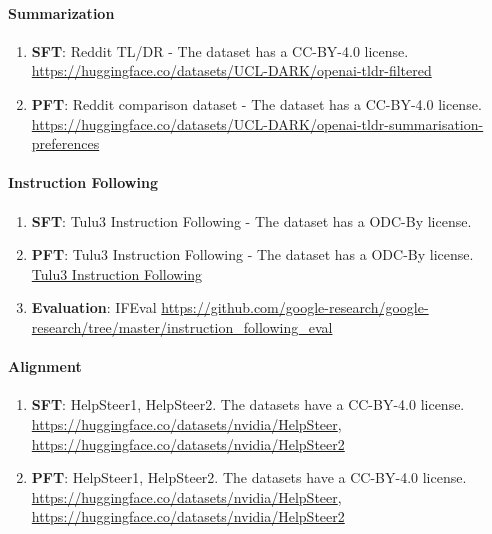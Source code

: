 \paragraph{Summarization}
\begin{enumerate}
    \item \textbf{SFT}: Reddit TL/DR - The dataset has a CC-BY-4.0 license. \href{https://huggingface.co/datasets/UCL-DARK/openai-tldr-filtered}{https://huggingface.co/datasets/UCL-DARK/openai-tldr-filtered}
    \item \textbf{PFT}: Reddit comparison dataset - The dataset has a CC-BY-4.0 license. \href{https://huggingface.co/datasets/UCL-DARK/openai-tldr-summarisation-preferences}{https://huggingface.co/datasets/UCL-DARK/openai-tldr-summarisation-preferences}

\end{enumerate}

\paragraph{Instruction Following}
\begin{enumerate}
    \item \textbf{SFT}: Tulu3 Instruction Following - The dataset has a ODC-By license. \href{https://huggingface.co/datasets/allenai/tulu-3-sft-personas-instruction-following}{}
    \item \textbf{PFT}: Tulu3 Instruction Following - The dataset has a ODC-By license. \href{https://huggingface.co/datasets/allenai/tulu-3-pref-personas-instruction-following}{Tulu3 Instruction Following}
    \item \textbf{Evaluation}: IFEval \href{https://github.com/google-research/google-research/tree/master/instruction_following_eval}{https://github.com/google-research/google-research/tree/master/instruction\_following\_eval}
\end{enumerate}

\paragraph{Alignment}
\begin{enumerate}
    \item \textbf{SFT}: HelpSteer1, HelpSteer2. The datasets have a CC-BY-4.0 license. \href{https://huggingface.co/datasets/nvidia/HelpSteer}{https://huggingface.co/datasets/nvidia/HelpSteer}, \href{https://huggingface.co/datasets/nvidia/HelpSteer2}{https://huggingface.co/datasets/nvidia/HelpSteer2}
    \item \textbf{PFT}: HelpSteer1, HelpSteer2. The datasets have a CC-BY-4.0 license. \href{https://huggingface.co/datasets/nvidia/HelpSteer}{https://huggingface.co/datasets/nvidia/HelpSteer}, \href{https://huggingface.co/datasets/nvidia/HelpSteer2}{https://huggingface.co/datasets/nvidia/HelpSteer2}

\end{enumerate}


